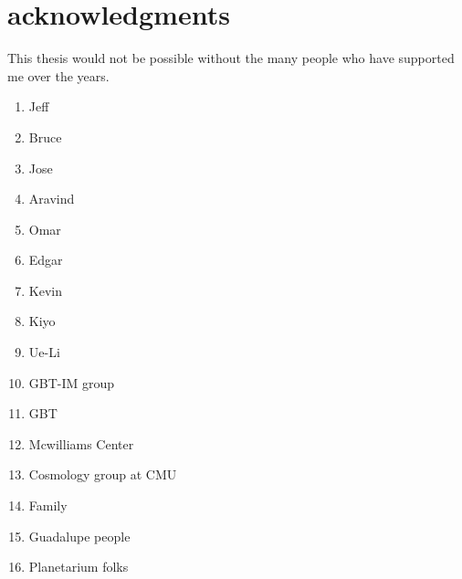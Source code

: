 \section*{acknowledgments}

This thesis would not be possible without the many people who have supported me over the years. 

\begin{enumerate}

\item Jeff
\item Bruce
\item Jose
\item Aravind
\item Omar
\item Edgar
\item Kevin 
\item Kiyo
\item Ue-Li
\item GBT-IM group
\item GBT
\item Mcwilliams Center
\item Cosmology group at CMU
\item Family
\item Guadalupe people
\item Planetarium folks

\end{enumerate}



